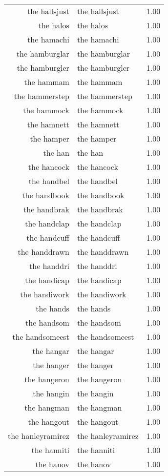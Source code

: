 \begin{table}[ht]
\begin{tabular}{rlr}
  the hallsjust & the hallsjust & 1.00 \\ 
  the halos & the halos & 1.00 \\ 
  the hamachi & the hamachi & 1.00 \\ 
  the hamburglar & the hamburglar & 1.00 \\ 
  the hamburgler & the hamburgler & 1.00 \\ 
  the hammam & the hammam & 1.00 \\ 
  the hammerstep & the hammerstep & 1.00 \\ 
  the hammock & the hammock & 1.00 \\ 
  the hamnett & the hamnett & 1.00 \\ 
  the hamper & the hamper & 1.00 \\ 
  the han & the han & 1.00 \\ 
  the hancock & the hancock & 1.00 \\ 
  the handbel & the handbel & 1.00 \\ 
  the handbook & the handbook & 1.00 \\ 
  the handbrak & the handbrak & 1.00 \\ 
  the handclap & the handclap & 1.00 \\ 
  the handcuff & the handcuff & 1.00 \\ 
  the handdrawn & the handdrawn & 1.00 \\ 
  the handdri & the handdri & 1.00 \\ 
  the handicap & the handicap & 1.00 \\ 
  the handiwork & the handiwork & 1.00 \\ 
  the hands & the hands & 1.00 \\ 
  the handsom & the handsom & 1.00 \\ 
  the handsomeest & the handsomeest & 1.00 \\ 
  the hangar & the hangar & 1.00 \\ 
  the hanger & the hanger & 1.00 \\ 
  the hangeron & the hangeron & 1.00 \\ 
  the hangin & the hangin & 1.00 \\ 
  the hangman & the hangman & 1.00 \\ 
  the hangout & the hangout & 1.00 \\ 
  the hanleyramirez & the hanleyramirez & 1.00 \\ 
  the hanniti & the hanniti & 1.00 \\ 
  the hanov & the hanov & 1.00 \\ 

\end{tabular}
\end{table}
